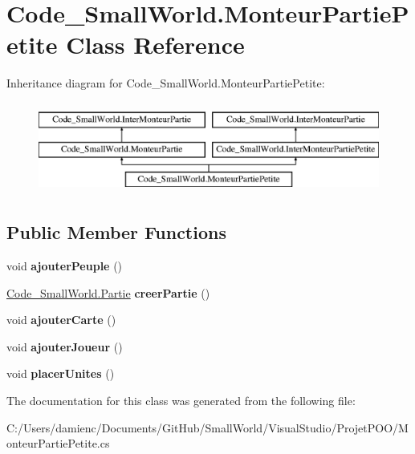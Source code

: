 \hypertarget{class_code___small_world_1_1_monteur_partie_petite}{\section{Code\-\_\-\-Small\-World.\-Monteur\-Partie\-Petite Class Reference}
\label{class_code___small_world_1_1_monteur_partie_petite}
}
Inheritance diagram for Code\-\_\-\-Small\-World.\-Monteur\-Partie\-Petite\-:\begin{figure}[H]
\begin{center}
\leavevmode
\includegraphics[height=3.000000cm]{class_code___small_world_1_1_monteur_partie_petite}
\end{center}
\end{figure}
\subsection*{Public Member Functions}
\begin{DoxyCompactItemize}
\item 
\hypertarget{class_code___small_world_1_1_monteur_partie_petite_a57934695a8b31d8b0e6a41c857f7da0f}{void {\bfseries ajouter\-Peuple} ()}\label{class_code___small_world_1_1_monteur_partie_petite_a57934695a8b31d8b0e6a41c857f7da0f}

\item 
\hypertarget{class_code___small_world_1_1_monteur_partie_petite_abd1097b50ddf84aaaa4eaaea598602e1}{\hyperlink{interface_code___small_world_1_1_partie}{Code\-\_\-\-Small\-World.\-Partie} {\bfseries creer\-Partie} ()}\label{class_code___small_world_1_1_monteur_partie_petite_abd1097b50ddf84aaaa4eaaea598602e1}

\item 
\hypertarget{class_code___small_world_1_1_monteur_partie_petite_ab14531d369212c8c67d2e7e52bd5a362}{void {\bfseries ajouter\-Carte} ()}\label{class_code___small_world_1_1_monteur_partie_petite_ab14531d369212c8c67d2e7e52bd5a362}

\item 
\hypertarget{class_code___small_world_1_1_monteur_partie_petite_aafe9f2e29347986daea49e95d4778096}{void {\bfseries ajouter\-Joueur} ()}\label{class_code___small_world_1_1_monteur_partie_petite_aafe9f2e29347986daea49e95d4778096}

\item 
\hypertarget{class_code___small_world_1_1_monteur_partie_petite_a0a57d5e7eeed60d8f4621851fc075fb2}{void {\bfseries placer\-Unites} ()}\label{class_code___small_world_1_1_monteur_partie_petite_a0a57d5e7eeed60d8f4621851fc075fb2}

\end{DoxyCompactItemize}


The documentation for this class was generated from the following file\-:\begin{DoxyCompactItemize}
\item 
C\-:/\-Users/damienc/\-Documents/\-Git\-Hub/\-Small\-World/\-Visual\-Studio/\-Projet\-P\-O\-O/Monteur\-Partie\-Petite.\-cs\end{DoxyCompactItemize}
